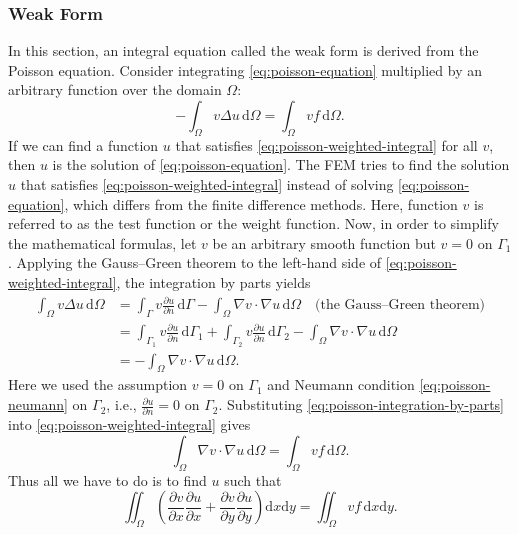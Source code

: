 \subsubsection{{Weak Form}}\label{subsec:weak-form}
{In this section, an integral equation called the weak form is derived from the Poisson equation. Consider integrating \eqref{eq:poisson-equation} multiplied by an arbitrary function over the domain $\Omega$:}
\begin{equation}\label{eq:poisson-weighted-integral}
-\int_\Omega v\Delta u\,\mathrm d\Omega=\int_\Omega vf\,\mathrm d\Omega.
\end{equation}
{If we can find a function $u$ that satisfies \eqref{eq:poisson-weighted-integral} for all $v$, then $u$ is the solution of \eqref{eq:poisson-equation}. The FEM tries to find the solution $u$ that satisfies \eqref{eq:poisson-weighted-integral} instead of solving \eqref{eq:poisson-equation}, which differs from the finite difference methods. Here, function $v$ is referred to as the test function or the weight function.}
{Now, in order to simplify the mathematical formulas, let $v$ be an arbitrary smooth function but $v=0$ on $\Gamma_1$. Applying the Gauss--Green theorem to the left-hand side of \eqref{eq:poisson-weighted-integral}, the integration by parts yields}
\begin{equation}\label{eq:poisson-integration-by-parts}
\begin{aligned}
\int_\Omega v\Delta u\,\mathrm d\Omega
&=\int_\Gamma v\frac{\partial u}{\partial n}\,\mathrm d\Gamma-\int_\Omega\nabla v\cdot\nabla u\,\mathrm d\Omega\quad\text{(the Gauss--Green theorem)}\\
&=\int_{\Gamma_1}v\frac{\partial u}{\partial n}\,\mathrm d\Gamma_1+\int_{\Gamma_2}v\frac{\partial u}{\partial n}\,\mathrm d\Gamma_2-\int_\Omega\nabla v\cdot\nabla u\,\mathrm d\Omega\\
&=-\int_\Omega\nabla v\cdot\nabla u\,\mathrm d\Omega.
\end{aligned}
\end{equation}
{Here we used the assumption $v=0$ on $\Gamma_1$ and Neumann condition \eqref{eq:poisson-neumann} on $\Gamma_2$, i.e., $\frac{\partial u}{\partial n}=0$ on $\Gamma_2$. Substituting \eqref{eq:poisson-integration-by-parts} into \eqref{eq:poisson-weighted-integral} gives}
\[\int_\Omega\nabla v\cdot\nabla u\,\mathrm d\Omega=\int_\Omega vf\,\mathrm d\Omega.\]
{Thus all we have to do is to find $u$ such that}
\begin{equation}\label{eq:poisson-weak-form}
\iint_\Omega\left(\frac{\partial v}{\partial x}\frac{\partial u}{\partial x}+\frac{\partial v}{\partial y}\frac{\partial u}{\partial y}\right)\mathrm dx\mathrm dy=\iint_\Omega vf\,\mathrm dx\mathrm dy.
\end{equation}
